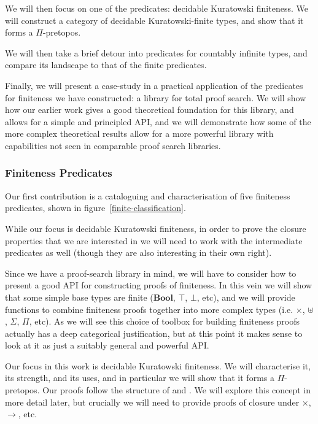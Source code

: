 We will then focus on one of the predicates: decidable Kuratowski finiteness.
We will construct a category of decidable Kuratowski-finite types, and show that
it forms a \(\Pi\)-pretopos.

We will then take a brief detour into predicates for countably infinite types,
and compare its landscape to that of the finite predicates.

Finally, we will present a case-study in a practical application of the
predicates for finiteness we have constructed: a library for total proof search.
We will show how our earlier work gives a good theoretical foundation for this
library, and allows for a simple and principled API, and we will demonstrate how
some of the more complex theoretical results allow for a more powerful library
with capabilities not seen in comparable proof search libraries.



\subsubsection{Finiteness Predicates}
Our first contribution is a cataloguing and characterisation of five finiteness
predicates, shown in figure~\ref{finite-classification}.

While our focus is decidable Kuratowski finiteness, in order to prove the
closure properties that we are interested in we will need to work with the
intermediate predicates as well (though they are also interesting in their own
right).

Since we have a proof-search library in mind, we will have to consider how to
present a good API for constructing proofs of finiteness.
In this vein we will show that some simple base types are finite
(\(\mathbf{Bool}\), \(\top\), \(\bot\), etc), and we will provide functions to
combine finiteness proofs together into more complex types (i.e. \(\times\),
\(\uplus\), \(\Sigma\), \(\Pi\), etc).
As we will see this choice of toolbox for building finiteness proofs actually
has a deep categorical justification, but at this point it makes sense to look
at it as just a suitably general and powerful API.



Our focus in this work is decidable Kuratowski finiteness.
We will characterise it, its strength, and its uses, and in particular we will
show that it forms a \(\Pi\)-pretopos.
Our proofs follow the structure of \cite[Chapters 9, 10]{hottbook} and
\cite{rijkeSetsHomotopyType2015}.
We will explore this concept in more detail later, but crucially we will need to
provide proofs of closure under \(\times\), \(\rightarrow\), etc.

